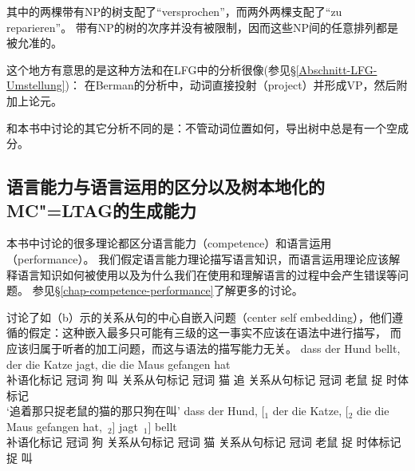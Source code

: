 其中的两棵带有NP的树支配了``{versprochen}''，而两外两棵支配了``{zu reparieren}''。
带有NP的树的次序并没有被限制，因而这些NP间的任意排列都是被允准的。\pagebreak

这个地方有意思的是这种方法和\citet[Section~2.1.3]{Berman96a-u}在LFG\indexlfg 中的分析很像(参见\S \ref{Abschnitt-LFG-Umstellung})：
在Berman的分析中，动词直接投射（project）并形成VP，然后附加上论元。

和本书中讨论的其它分析不同的是：不管动词位置如何，导出树中总是有一个空成分。

\subsection{语言能力与语言运用的区分以及树本地化的MC"=LTAG的生成能力}
\label{Abschnitt-Kompetenz-Performanz-TAG}

本书中讨论的很多理论都区分语言能力（competence）和语言运用（performance）\citep[Section~I.1]{Chomsky65a}。
我们假定语言能力理论描写语言知识，而语言运用理论应该解释语言知识如何被使用以及为什么我们在使用和理解语言的过程中会产生错误等问题。
参见\S \ref{chap-competence-performance}了解更多的讨论。 

\citet*{JBR2000a}讨论了如（b）示的关系从句的中心自嵌入问题（center self embedding），他们遵循\citet[]{CM63a}的假定：这种嵌入最多只可能有三级的这一事实不应该在语法中进行描写，
而应该归属于听者的加工问题，而这与语法的描写能力无关。
\eal
\label{TAG-Beispiel-Performanz}
\ex 
\gll dass der Hund bellt, der  die Katze jagt,  die  die Maus  gefangen hat\\
     补语化标记 冠词 狗  叫  关系从句标记 冠词 猫 追 关系从句标记 冠词 老鼠 捉 时体标记   \\
\glt `追着那只捉老鼠的猫的那只狗在叫'
\ex 
\gll dass der Hund, [$_1$ der  die Katze, [$_2$ die  die Maus  gefangen hat,~$_2$] jagt~$_1$] bellt\\
     补语化标记 冠词 狗  {}  关系从句标记 冠词 猫 {} 关系从句标记 冠词 老鼠 捉 时体标记   捉 叫 \\
\zl

